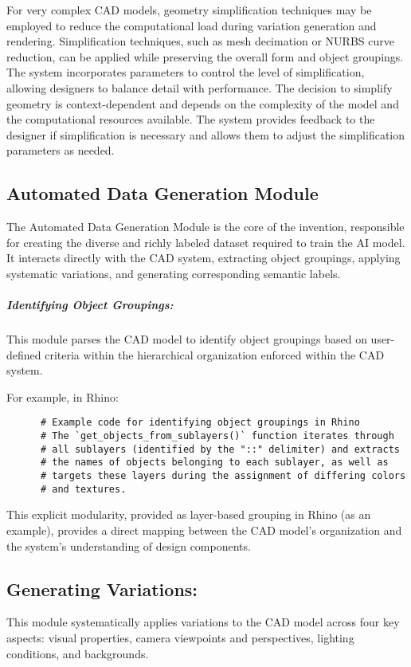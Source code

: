\documentclass{article}
\begin{document}
For very complex CAD models, geometry simplification techniques may be employed to reduce the computational load during variation generation and rendering. Simplification techniques, such as mesh decimation or NURBS curve reduction, can be applied while preserving the overall form and object groupings. The system incorporates parameters to control the level of simplification, allowing designers to balance detail with performance. The decision to simplify geometry is context-dependent and depends on the complexity of the model and the computational resources available. The system provides feedback to the designer if simplification is necessary and allows them to adjust the simplification parameters as needed.

\subsection{Automated Data Generation Module}

The Automated Data Generation Module is the core of the invention, responsible for creating the diverse and richly labeled dataset required to train the AI model. It interacts directly with the CAD system, extracting object groupings, applying systematic variations, and generating corresponding semantic labels.

\subparagraph{Identifying Object Groupings:} This module parses the CAD model to identify object groupings based on user-defined criteria within the hierarchical organization enforced within the CAD system.

For example, in Rhino:

    \begin{verbatim}
      # Example code for identifying object groupings in Rhino
      # The `get_objects_from_sublayers()` function iterates through 
      # all sublayers (identified by the "::" delimiter) and extracts 
      # the names of objects belonging to each sublayer, as well as 
      # targets these layers during the assignment of differing colors
      # and textures.
    \end{verbatim}  

This explicit modularity, provided as layer-based grouping in Rhino (as an example), provides a direct mapping between the CAD model's organization and the system's understanding of design components.

\subsection{Generating Variations:} This module systematically applies variations to the CAD model across four key aspects: visual properties, camera viewpoints and perspectives, lighting conditions, and backgrounds.
\end{document}
